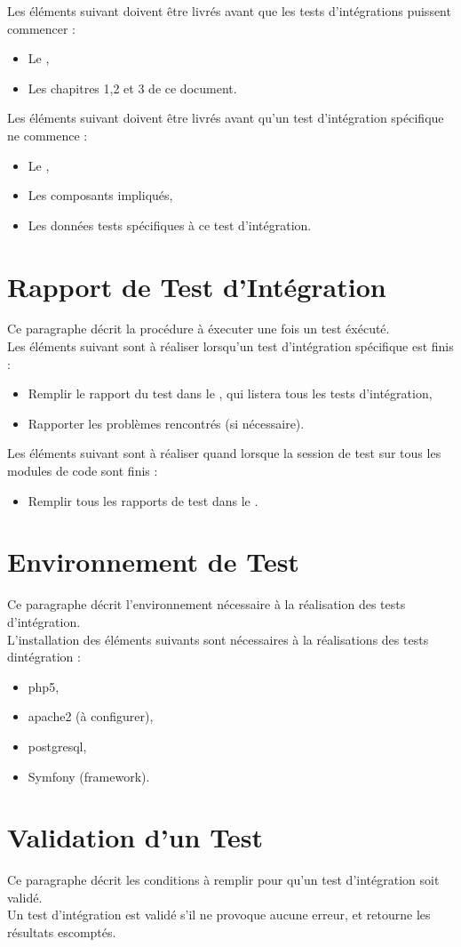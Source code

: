   	Les éléments suivant doivent être livrés avant que les tests d'intégrations puissent commencer :
  	\begin{itemize}
  		\item Le \PTU,
  		\item Les chapitres 1,2 et 3 de ce document.
  	\end{itemize}
  	
  	Les éléments suivant doivent être livrés avant qu'un test d'intégration spécifique ne commence :
  	\begin{itemize}
  		\item Le \JTU,
  		\item Les composants impliqués,
  		\item Les données tests spécifiques à ce test d'intégration.
  	\end{itemize}
  
  \section{Rapport de Test d'Intégration}  
  	Ce paragraphe décrit la procédure à éxecuter une fois un test éxécuté.  \\
  	
  	Les éléments suivant sont à réaliser lorsqu'un test d'intégration spécifique est finis : 
  	\begin{itemize}
  		\item Remplir le rapport du test dans le \JTU, qui listera tous les tests d'intégration,
  		\item Rapporter les problèmes rencontrés (si nécessaire).
  	\end{itemize}
  	
  	Les éléments suivant sont à réaliser quand lorsque la session de test sur tous les modules de code sont finis : 
  	\begin{itemize}
  		\item Remplir tous les rapports de test dans le \JTU.
  	\end{itemize}
  
  \section{Environnement de Test}
	  Ce paragraphe décrit l'environnement nécessaire à la réalisation des tests d'intégration. \\
	  
	  L'installation des éléments suivants sont nécessaires à la réalisations des tests dintégration : 
	  \begin{itemize}
	  	\item php5,
	  	\item apache2 (à configurer),
	  	\item postgresql,
	  	\item Symfony (framework).
	  \end{itemize}
  
  \section{Validation d'un Test}
	Ce paragraphe décrit les conditions à remplir pour qu'un test d'intégration soit validé.\\
  
  	Un test d'intégration est validé s'il ne provoque aucune erreur, et retourne les résultats escomptés. 
  	
  	